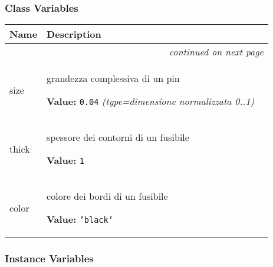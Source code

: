 
  \subsubsection{Class Variables}

    \vspace{-1cm}
\hspace{\varindent}\begin{longtable}{|p{\varnamewidth}|p{\vardescrwidth}|l}
\cline{1-2}
\cline{1-2} \centering \textbf{Name} & \centering \textbf{Description}& \\
\cline{1-2}
\endhead\cline{1-2}\multicolumn{3}{r}{\small\textit{continued on next page}}\\\endfoot\cline{1-2}
\endlastfoot\raggedright s\-i\-z\-e\- & \raggedright grandezza complessiva di un pin

\textbf{Value:} 
{\tt 0.04}            {\it (type=dimensione normalizzata 0..1)}&\\
\cline{1-2}
\raggedright t\-h\-i\-c\-k\- & \raggedright spessore dei contorni di un fusibile

\textbf{Value:} 
{\tt 1}&\\
\cline{1-2}
\raggedright c\-o\-l\-o\-r\- & \raggedright colore dei bordi di un fusibile

\textbf{Value:} 
{\tt \texttt{'}\texttt{black}\texttt{'}}&\\
\cline{1-2}
\end{longtable}



  \subsubsection{Instance Variables}

